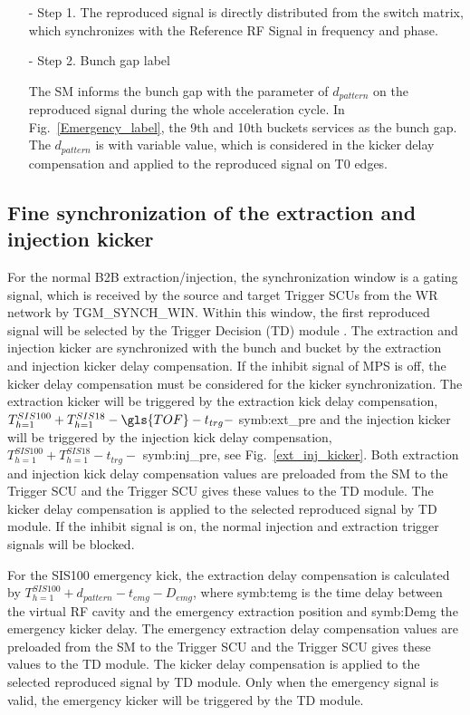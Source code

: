 \begin{itemize}
\begin{itemize}
\item[-] Step 1. The reproduced signal is directly distributed from the switch matrix, which synchronizes with the Reference RF Signal in frequency and phase.
\item[-] Step 2. Bunch gap label

The SM informs the bunch gap with the parameter of $d_{pattern}$ on the reproduced signal during the whole acceleration cycle. In Fig.~\ref{Emergency_label}, the 9th and 10th buckets services as the bunch gap. The $d_{pattern}$ is with variable value, which is considered in the kicker delay compensation and applied to the reproduced signal on T0 edges.

\end{itemize}

\end{itemize}

\subsection{Fine synchronization of the extraction and injection kicker}
For the normal B2B extraction/injection, the synchronization window is a gating signal, which is received by the source and target Trigger SCUs from the WR network by TGM\_SYNCH\_WIN. Within this window, the first reproduced signal will be selected by the Trigger Decision (\gls{TD}) module . The extraction and injection kicker are synchronized with the bunch and bucket by the extraction and injection kicker delay compensation. If the inhibit signal of MPS is off, the kicker delay compensation must be considered for the kicker synchronization. The extraction kicker will be triggered by the extraction kick delay compensation, $T_{h=1}^{SIS100} + T_{h=1}^{SIS18} -\gls{TOF} - t_{trg} -$ \gls{symb:ext_pre} and the injection kicker will be triggered by the injection kick delay compensation, $T_{h=1}^{SIS100} + T_{h=1}^{SIS18} - t_{trg} -$ \gls{symb:inj_pre}, see Fig.~\ref{ext_inj_kicker}. Both extraction and injection kick delay compensation values are preloaded from the SM to the Trigger SCU and the Trigger SCU gives these values to the TD module. The kicker delay compensation is applied to the selected reproduced signal by TD module. If the inhibit signal is on, the normal injection and extraction trigger signals will be blocked.

For the SIS100 emergency kick, the extraction delay compensation is calculated by $T_{h=1}^{SIS100} + d_{pattern} - t_{emg} - D_{emg}$, where \gls{symb:temg} is the time delay between the virtual RF cavity and the emergency extraction position and \gls{symb:Demg} the emergency kicker delay. The emergency extraction delay compensation values are preloaded from the SM to the Trigger SCU and the Trigger SCU gives these values to the TD module. The kicker delay compensation is applied to the selected reproduced signal by TD module. Only when the emergency signal is valid, the emergency kicker will be triggered by the TD module.


